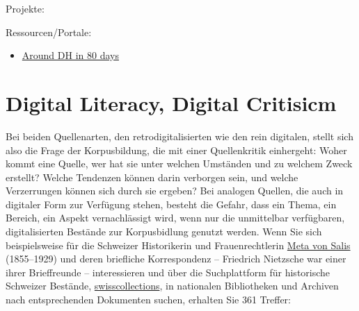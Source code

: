 \documentclass[
  letterpaper,
]{book}
\providecommand{\tightlist}{%
  \setlength{\itemsep}{0pt}\setlength{\parskip}{0pt}}\usepackage{longtable,booktabs,array}
\begin{document}
Projekte:

Ressourcen/Portale:

\begin{itemize}
\tightlist
\item
  \href{https://arounddh.org/index.html}{Around DH in 80 days}
\end{itemize}


\hypertarget{digital-literacy-digital-critisicm}{%
\chapter{Digital Literacy, Digital
Critisicm}\label{digital-literacy-digital-critisicm}}

Bei beiden Quellenarten, den retrodigitalisierten wie den rein
digitalen, stellt sich also die Frage der Korpusbildung, die mit einer
Quellenkritik einhergeht: Woher kommt eine Quelle, wer hat sie unter
welchen Umständen und zu welchem Zweck erstellt? Welche Tendenzen können
darin verborgen sein, und welche Verzerrungen können sich durch sie
ergeben? Bei analogen Quellen, die auch in digitaler Form zur Verfügung
stehen, besteht die Gefahr, dass ein Thema, ein Bereich, ein Aspekt
vernachlässigt wird, wenn nur die unmittelbar verfügbaren,
digitalisierten Bestände zur Korpusbidlung genutzt werden. Wenn Sie sich
beispielsweise für die Schweizer Historikerin und Frauenrechtlerin
\href{https://de.wikipedia.org/wiki/Meta_von_Salis}{Meta von Salis}
(1855--1929) und deren briefliche Korrespondenz -- Friedrich Nietzsche
war einer ihrer Brieffreunde -- interessieren und über die Suchplattform
für historische Schweizer Bestände,
\href{https://swisscollections.ch/Search/Advanced}{swisscollections}, in
nationalen Bibliotheken und Archiven nach entsprechenden Dokumenten
suchen, erhalten Sie 361 Treffer:
\end{document}
